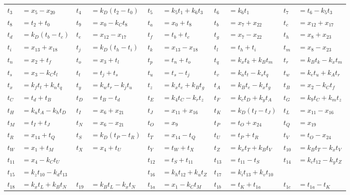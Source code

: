 \begin{tabular}{|p{4.3pt}l|p{4.3pt}l|p{4.3pt}l|p{4.3pt}l|p{4.3pt}l|}
$t_3 $ &$= x_5 - x_{20}$ & $t_4 $ &$= k_D(t_2 - t_0)$ & $t_5 $ &$= k_5t_1 + k_6t_3$ & $t_6 $ &$= k_6t_1$ & $t_7 $ &$= t_6 - k_5t_3$\\ 
$t_8 $ &$= t_2 + t_0$ & $t_9 $ &$= x_0 - k_Ct_8$ & $t_a $ &$= x_0 + t_8$ & $t_b $ &$= x_7 + x_{22}$ & $t_c $ &$= x_{12} + x_{17}$\\ 
$t_d $ &$= k_D(t_b - t_c)$ & $t_e $ &$= x_{12} - x_{17}$ & $t_f $ &$= t_b + t_c$ & $t_g $ &$= x_7 - x_{22}$ & $t_h $ &$= x_8 + x_{23}$\\ 
$t_i $ &$= x_{13} + x_{18}$ & $t_j $ &$= k_D(t_h - t_i)$ & $t_k $ &$= x_{13} - x_{18}$ & $t_l $ &$= t_h + t_i$ & $t_m $ &$= x_8 - x_{23}$\\ 
$t_n $ &$= x_2 + t_f$ & $t_o $ &$= x_3 + t_l$ & $t_p $ &$= t_n + t_o$ & $t_q $ &$= k_xt_k + k_Bt_m$ & $t_r $ &$= k_Bt_k - k_xt_m$\\ 
$t_s $ &$= x_3 - k_Ct_l$ & $t_t $ &$= t_j + t_s$ & $t_u $ &$= t_s - t_j$ & $t_v $ &$= k_at_t - k_st_q$ & $t_w $ &$= k_et_u + k_At_r$\\ 
$t_x $ &$= k_ft_t + k_nt_q$ & $t_y $ &$= k_wt_r - k_jt_u$ & $t_z $ &$= k_xt_e + k_Bt_g$ & $t_A $ &$= k_Bt_e - k_xt_g$ & $t_B $ &$= x_2 - k_Ct_f$\\ 
$t_C $ &$= t_d + t_B$ & $t_D $ &$= t_B - t_d$ & $t_E $ &$= k_4t_C - k_rt_z$ & $t_F $ &$= k_ct_D + k_yt_A$ & $t_G $ &$= k_9t_C + k_mt_z$\\ 
$t_H $ &$= k_ut_A - k_ht_D$ & $t_I $ &$= x_6 + x_{21}$ & $t_J $ &$= x_{11} + x_{16}$ & $t_K $ &$= k_D(t_I - t_J)$ & $t_L $ &$= x_{11} - x_{16}$\\ 
$t_M $ &$= t_I + t_J$ & $t_N $ &$= x_6 - x_{21}$ & $t_O $ &$= x_9$ & $t_P $ &$= t_O + x_{24}$ & $t_Q $ &$= x_{19}$\\ 
$t_R $ &$= x_{14} + t_Q$ & $t_S $ &$= k_D(t_P - t_R)$ & $t_T $ &$= x_{14} - t_Q$ & $t_U $ &$= t_P + t_R$ & $t_V $ &$= t_O - x_{24}$\\ 
$t_W $ &$= x_1 + t_M$ & $t_X $ &$= x_4 + t_U$ & $t_Y $ &$= t_W + t_X$ & $t_Z $ &$= k_xt_T + k_Bt_V$ & $t_{10} $ &$= k_Bt_T - k_xt_V$\\ 
$t_{11} $ &\multicolumn{3}{l|}{$= x_4 - k_Ct_U$} & $t_{12} $ &$= t_S + t_{11}$ & $t_{13} $ &$= t_{11} - t_S$ & $t_{14} $ &$= k_ct_{12} - k_yt_Z$\\ 
$t_{15} $ &\multicolumn{3}{l|}{$= k_zt_{10} - k_dt_{13}$} & $t_{16} $ &$= k_ht_{12} + k_ut_Z$ & $t_{17} $ &\multicolumn{3}{l|}{$= k_it_{13} + k_vt_{10}$}\\ 
$t_{18} $ &$= k_xt_L + k_Bt_N$ & $t_{19} $ &$= k_Bt_L - k_xt_N$ & $t_{1a} $ &$= x_1 - k_Ct_M$ & $t_{1b} $ &$= t_K + t_{1a}$ & $t_{1c} $ &$= t_{1a} - t_K$\\ 

\end{tabular}
